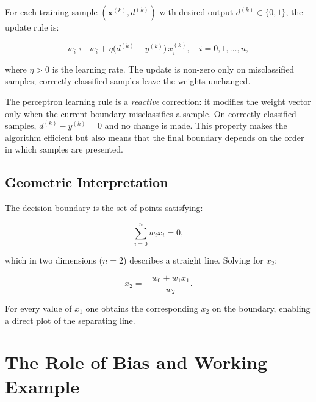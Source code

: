 \documentclass[12pt,a4paper]{article}
\begin{document}
For each training sample $(\mathbf{x}^{(k)}, d^{(k)})$ with desired
output $d^{(k)} \in \{0,1\}$, the update rule is:

\begin{equation}
  \label{eq:update}
  w_i \leftarrow w_i + \eta \bigl(d^{(k)} - y^{(k)}\bigr)\, x_i^{(k)},
  \quad i = 0, 1, \ldots, n,
\end{equation}

where $\eta > 0$ is the learning rate.  The update is non-zero only on
misclassified samples; correctly classified samples leave the weights
unchanged.

\begin{keyinsight}[title=Key Insight -- Weight Update on Misclassification Only]
The perceptron learning rule is a \emph{reactive} correction: it modifies
the weight vector only when the current boundary misclassifies a sample.
On correctly classified samples, $d^{(k)} - y^{(k)} = 0$ and no change
is made.  This property makes the algorithm efficient but also means that
the final boundary depends on the order in which samples are presented.
\end{keyinsight}

\subsection{Geometric Interpretation}
\label{subsec:geometry}

The decision boundary is the set of points satisfying:

\begin{equation}
  \label{eq:boundary}
  \sum_{i=0}^{n} w_i x_i = 0,
\end{equation}

which in two dimensions ($n = 2$) describes a straight line.  Solving
for $x_2$:

\begin{equation}
  \label{eq:line}
  x_2 = -\frac{w_0 + w_1 x_1}{w_2}.
\end{equation}

For every value of $x_1$ one obtains the corresponding $x_2$ on the
boundary, enabling a direct plot of the separating line.

\section{The Role of Bias and Working Example}
\label{sec:bias}
\end{document}
